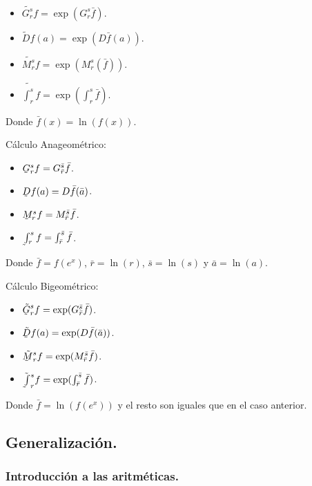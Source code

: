 \begin{itemize}
	\item $\tilde{G_r^s}f = \exp(G_r^s \bar{f})$.
	\item $\tilde{D}f(a) = \exp(D\bar{f}(a))$.
	\item $\tilde{M_r^s}f = \exp(M_r^s(\bar{f}))$.
	\item $\tilde{\int_r^s} f = \exp(\int_r^s \bar{f})$.
\end{itemize}

Donde $\bar{f}(x) = \ln(f(x))$.

Cálculo Anageométrico:

\begin{itemize}
	\item $\underaccent{\tilde}{G}_r^s f = G_{\bar{r}}^{\bar{s}} \bar{f}$.
	\item $\underaccent{\tilde}{D}f(a) = D\bar{f}(\bar{a})$.
	\item $\underaccent{\tilde}{M}_r^sf = M_{\bar{r}}^{\bar{s}} \bar{f}$.
	\item $\underaccent{\tilde}{\int}_r^s f = \int_{\bar{r}}^{\bar{s}} \bar{f}$.
\end{itemize}

Donde $\bar{f} = f(e^x)$, $\bar{r} = \ln(r)$, $\bar{s} = \ln(s)$ y $\bar{a} = \ln(a)$.

Cálculo Bigeométrico:

\begin{itemize}
	\item $\tilde{\underaccent{\tilde}{G}}_r^s f = \exp(G_{\bar{r}}^{\bar{s}} \bar{f})$.
	\item $\tilde{\underaccent{\tilde}{D}}f(a) = \exp(D\bar{f}(\bar{a}))$.
	\item $\tilde{\underaccent{\tilde}{M}}_r^s f = \exp(M_{\bar{r}}^{\bar{s}} \bar{f})$.
	\item $\tilde{\underaccent{\tilde}{\int}}_r^s f = \exp(\int_{\bar{r}}^{\bar{s}} \bar{f})$.
\end{itemize}

Donde $\bar{f} = \ln(f(e^x))$ y el resto son iguales que en el caso anterior.

\subsection{Generalización.} \label{general}

\subsubsection{Introducción a las aritméticas.}

